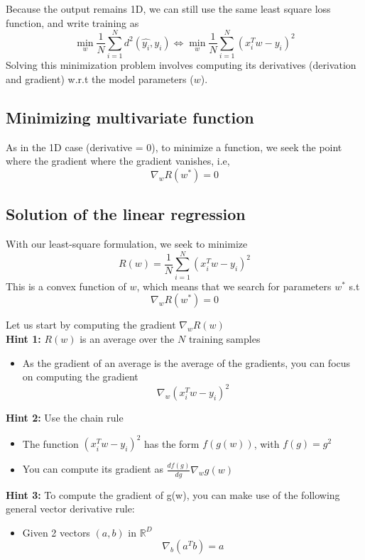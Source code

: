 Because the output remains 1D, we can still use the same least square loss function, and write training as 
\[
\min_w \frac{1}{N}\sum_{i=1}^{N}d^2\left(\hat{y_i}, y_i\right) \iff \min_w \frac{1}{N}\sum_{i=1}^{N}\left(x_i^Tw-y_i\right)^2  
\]
Solving this minimization problem involves computing its derivatives (derivation and gradient) w.r.t the model parameters ($w$). 

\subsection{Minimizing multivariate function}%
\label{sub:Minimizing multivariate function}
As in the 1D case (derivative = 0), to minimize a function, we seek the point  where the gradient where the gradient vanishes, i.e, 
\[
\nabla_wR(w^*) = 0
\]

\subsection{Solution of the linear regression}
With our least-square formulation, we seek to minimize
\[
  R(w) = \frac{1}{N}\sum_{i=1}^{N}(x_i^Tw - y_i)^2  
\]
This is a convex function of $w$, which means that we search for parameters \textbf{$w^*$} s.t
\[
 \nabla_w R(w^*) = 0 
\]   


Let us start by computing the gradient $\nabla_w R(w)$ \\

\textbf{Hint 1:} $R(w)$ is an average over the $N$ training samples
\begin{itemize}
  \item As the gradient of an average is the average of the gradients, you can focus on computing the gradient 
  \[
    \nabla_w(x_i^Tw - y_i)^2
  \]
\end{itemize}

\textbf{Hint 2:} Use the chain rule
\begin{itemize}
  \item The function $(x_i^Tw - y_i)^2$ has the form $f(g(w))$, with $f(g) = g^2$
  \item You can compute its gradient as $\frac{df(g)}{dg}\nabla_w g(w)$
\end{itemize}

\textbf{Hint 3:} To compute the gradient of g(w), you can make use of the following general vector derivative rule:
\begin{itemize}
  \item Given 2 vectors $(a,b)$ in $\mathbb{R}^D$
    \[
    \nabla_b(a^Tb) = a
    \]
\end{itemize}

